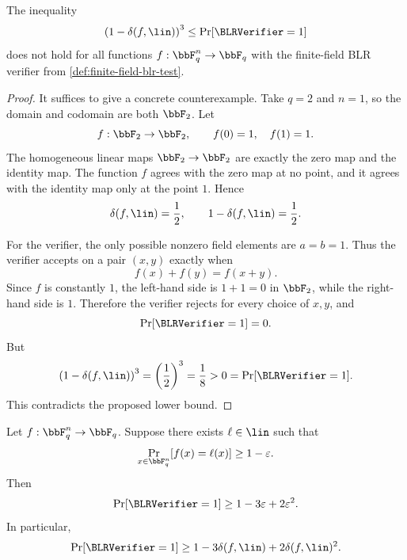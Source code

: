 \begin{theorem}
\label{thm:blr-cubic-lower-bound-counterexample}
The inequality
\[
    \left(1-\delta(f,\lin)\right)^3
    \le
    \Pr[\BLRVerifier=1]
\]
does not hold for all functions $f:\bbF_q^n\to\bbF_q$ with the finite-field BLR verifier
from \cref{def:finite-field-blr-test}.
\end{theorem}

\begin{proof}
It suffices to give a concrete counterexample. Take $q=2$ and $n=1$, so the domain and
codomain are both $\bbF_2$. Let
\[
    f:\bbF_2\to\bbF_2,
    \qquad
    f(0)=1,\quad f(1)=1.
\]
The homogeneous linear maps $\bbF_2\to\bbF_2$ are exactly the zero map and the identity map.
The function $f$ agrees with the zero map at no point, and it agrees with the identity map
only at the point $1$. Hence
\[
    \delta(f,\lin)=\frac{1}{2},
    \qquad
    1-\delta(f,\lin)=\frac{1}{2}.
\]

For the verifier, the only possible nonzero field elements are $a=b=1$. Thus the verifier
accepts on a pair $(x,y)$ exactly when
\[
    f(x)+f(y)=f(x+y).
\]
Since $f$ is constantly $1$, the left-hand side is $1+1=0$ in $\bbF_2$, while the
right-hand side is $1$. Therefore the verifier rejects for every choice of $x,y$, and
\[
    \Pr[\BLRVerifier=1]=0.
\]
But
\[
    \left(1-\delta(f,\lin)\right)^3
    =
    \left(\frac{1}{2}\right)^3
    =
    \frac{1}{8}
    >
    0
    =
    \Pr[\BLRVerifier=1].
\]
This contradicts the proposed lower bound.
\end{proof}

\begin{theorem}
\label{thm:blr-lower-bound-from-agreement}
Let $f:\bbF_q^n\to\bbF_q$. Suppose there exists $\ell\in\lin$ such that
\[
    \Pr_{x\in\bbF_q^n}[f(x)=\ell(x)]\ge 1-\varepsilon.
\]
Then
\[
    \Pr[\BLRVerifier=1]\ge 1-3\varepsilon+2\varepsilon^2.
\]
In particular,
\[
    \Pr[\BLRVerifier=1]\ge 1-3\delta(f,\lin)+2\delta(f,\lin)^2.
\]
\end{theorem}

